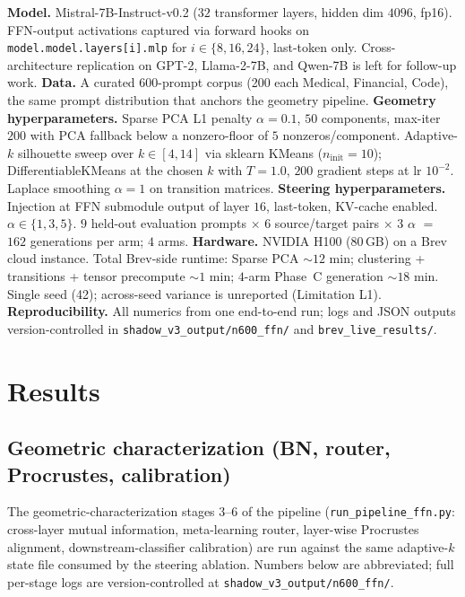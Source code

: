 \documentclass[10pt,twocolumn]{article}
\begin{document}
\textbf{Model.} Mistral-7B-Instruct-v0.2 ($32$ transformer layers, hidden dim $4096$, fp16). FFN-output activations captured via forward hooks on \texttt{model.model.layers[i].mlp} for $i\in\{8,16,24\}$, last-token only. Cross-architecture replication on GPT-2, Llama-2-7B, and Qwen-7B is left for follow-up work.
\textbf{Data.} A curated $600$-prompt corpus (200 each Medical, Financial, Code), the same prompt distribution that anchors the geometry pipeline.
\textbf{Geometry hyperparameters.} Sparse PCA L1 penalty $\alpha{=}0.1$, $50$ components, max-iter $200$ with PCA fallback below a nonzero-floor of $5$ nonzeros/component. Adaptive-$k$ silhouette sweep over $k\in[4,14]$ via sklearn KMeans ($n_{\text{init}}{=}10$); DifferentiableKMeans at the chosen $k$ with $T{=}1.0$, $200$ gradient steps at lr $10^{-2}$. Laplace smoothing $\alpha{=}1$ on transition matrices.
\textbf{Steering hyperparameters.} Injection at FFN submodule output of layer $16$, last-token, KV-cache enabled. $\alpha\in\{1,3,5\}$. $9$ held-out evaluation prompts $\times$ $6$ source/target pairs $\times$ $3$ $\alpha$ $=$ $162$ generations per arm; $4$ arms.
\textbf{Hardware.} NVIDIA H100 (80\,GB) on a Brev cloud instance. Total Brev-side runtime: Sparse PCA $\sim 12$ min; clustering + transitions + tensor precompute $\sim 1$ min; $4$-arm Phase~C generation $\sim 18$ min. Single seed (42); across-seed variance is unreported (Limitation L1).
\textbf{Reproducibility.} All numerics from one end-to-end run; logs and JSON outputs version-controlled in \texttt{shadow\_v3\_output/n600\_ffn/} and \texttt{brev\_live\_results/}.

\section{Results}
\label{sec:results}

\subsection{Geometric characterization (BN, router, Procrustes, calibration)}
\label{sec:results-bn}

The geometric-characterization stages 3--6 of the pipeline (\texttt{run\_pipeline\_ffn.py}: cross-layer mutual information, meta-learning router, layer-wise Procrustes alignment, downstream-classifier calibration) are run against the same adaptive-$k$ state file consumed by the steering ablation. Numbers below are abbreviated; full per-stage logs are version-controlled at \texttt{shadow\_v3\_output/n600\_ffn/}.
\end{document}
